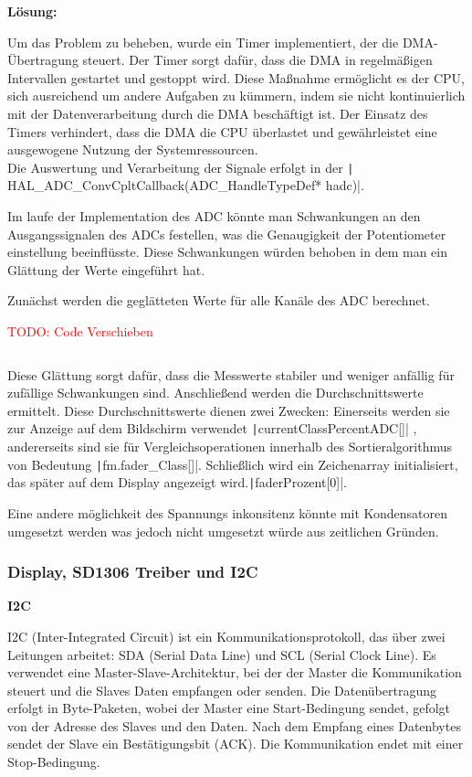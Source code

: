 \textbf{Lösung:}

Um das Problem zu beheben, wurde ein Timer implementiert, der die DMA-Übertragung steuert. Der Timer sorgt dafür, dass die DMA in regelmäßigen Intervallen gestartet und gestoppt wird. Diese Maßnahme ermöglicht es der CPU, sich ausreichend um andere Aufgaben zu kümmern, indem sie nicht kontinuierlich mit der Datenverarbeitung durch die DMA beschäftigt ist. Der Einsatz des Timers verhindert, dass die DMA die CPU überlastet und gewährleistet eine ausgewogene Nutzung der Systemressourcen. \\

Die Auswertung und Verarbeitung der Signale erfolgt in der  \texttt| HAL_ADC_ConvCpltCallback(ADC_HandleTypeDef* hadc)|.

Im laufe der Implementation des ADC könnte man Schwankungen an den Ausgangssignalen des ADCs festellen, was die Genaugigkeit der Potentiometer einstellung beeinflüsste. Diese Schwankungen würden behoben in dem man ein Glättung der Werte eingeführt hat.

Zunächst werden die geglätteten Werte für alle Kanäle des ADC berechnet.

\textcolor{red}{TODO: Code Verschieben}

 \inputminted[firstline=121, lastline=135]{c}{../../f401_display_encoder_fader_test/Core/Src/interface.c}

Diese Glättung sorgt dafür, dass die Messwerte stabiler und weniger anfällig für zufällige Schwankungen sind. Anschließend werden die Durchschnittswerte ermittelt. Diese Durchschnittswerte dienen zwei Zwecken: Einerseits werden sie zur Anzeige auf dem Bildschirm verwendet  \texttt|currentClassPercentADC[]|
, andererseits sind sie für Vergleichsoperationen innerhalb des Sortieralgorithmus von Bedeutung  \texttt|fm.fader_Class[]|.
 Schließlich wird ein Zeichenarray initialisiert, das später auf dem Display angezeigt wird.\texttt|faderProzent[0]|.
 
Eine andere möglichkeit des Spannungs inkonsitenz könnte mit Kondensatoren umgesetzt werden was jedoch nicht umgesetzt würde aus zeitlichen Gründen.

\newpage
\subsubsection{Display, SD1306 Treiber und I2C}

\textbf{I2C}

I2C (Inter-Integrated Circuit) ist ein Kommunikationsprotokoll, das über zwei Leitungen arbeitet: SDA (Serial Data Line) und SCL (Serial Clock Line). Es verwendet eine Master-Slave-Architektur, bei der der Master die Kommunikation steuert und die Slaves Daten empfangen oder senden. Die Datenübertragung erfolgt in Byte-Paketen, wobei der Master eine Start-Bedingung sendet, gefolgt von der Adresse des Slaves und den Daten. Nach dem Empfang eines Datenbytes sendet der Slave ein Bestätigungsbit (ACK). Die Kommunikation endet mit einer Stop-Bedingung.

